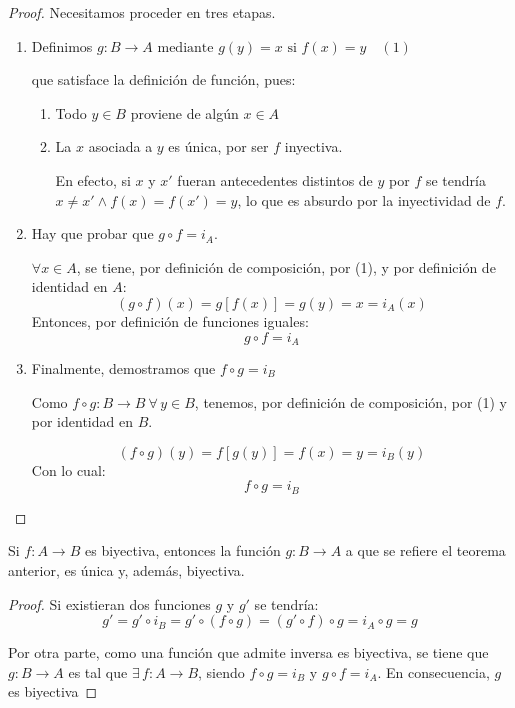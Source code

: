 \begin{enumerate}
	\begin{proof}
		Necesitamos proceder en tres etapas.
		
		\begin{enumerate}[label=\textbf{\alph*)}]
			\item Definimos
			$g: B \rightarrow A \mbox{ mediante } g(y)= x \mbox{ si } f(x) = y
			\quad (1)$
			
			que satisface la definición de función, pues:
			\begin{enumerate}[label=\roman*), ref=\roman*]
				\item Todo $y \in B$ proviene de algún $x \in A$
				\item La $x$ asociada a $y$ es única, por ser $f$ inyectiva.
				
				En efecto, si $x$ y $x'$ fueran antecedentes distintos de $y$ por $f$
				se tendría $x \ne x' \land f(x) = f(x') = y$, lo que es absurdo por la
				inyectividad de $f$.
			\end{enumerate}
		\item Hay que probar que $g \circ f = i_A$.
		
		$\forall x \in A$, se tiene, por definición de composición, por (1), y
		por definición de identidad en $A$:
		\[ (g \circ  f)(x) = g[f(x)] = g(y) = x = i_A(x)\]
		Entonces, por definición de funciones iguales:
		\[ g \circ f = i_A \]

		\item Finalmente, demostramos que $f \circ g = i_B$
		
		Como $f \circ g: B \rightarrow B \ \forall \, y \in B$, tenemos, por definición
		de composición, por (1) y por identidad en $B$.
		
		\[ (f \circ g)(y) = f[g(y)] = f(x) = y = i_B(y) \]
		Con lo cual:
		\[ f \circ g = i_B \]
	\end{enumerate}
\end{proof}
\end{enumerate}

\begin{mdframed}[backgroundcolor=gray!20, linecolor=black, linewidth=1pt,
	frametitle={Consecuencia}]
	Si $f: A \rightarrow B$ es biyectiva, entonces la función $g:B \rightarrow A$ a 
	que se refiere el teorema anterior, es única y, además, biyectiva.
\end{mdframed}
\begin{proof}
	Si existieran dos funciones $g$ y $g'$ se tendría:
	\[ g' = g' \circ i_B = g' \circ (f \circ g) = (g' \circ f) \circ g = 
	i_A \circ g = g \]
	
	Por otra parte, como una función que admite inversa es biyectiva, se tiene 
	que $g: B \rightarrow A$ es tal que $\exists \, f: A \rightarrow B$, siendo
	$f \circ g = i_B$ y $g \circ f = i_A$. En consecuencia, $g$ es biyectiva
\end{proof}


